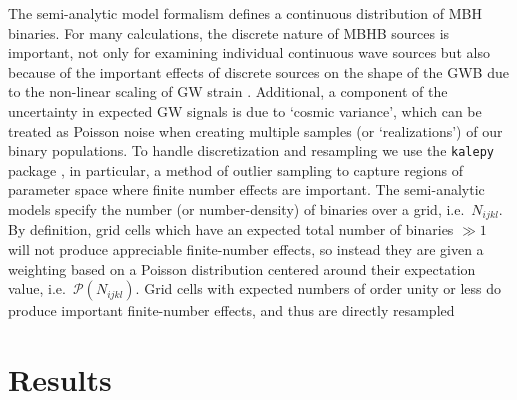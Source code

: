         The semi-analytic model formalism defines a continuous distribution of MBH binaries.  For many calculations, the discrete nature of MBHB sources is important, not only for examining individual continuous wave sources but also because of the important effects of discrete sources on the shape of the GWB due to the non-linear scaling of GW strain \citep{Sesana+2008}.  Additional, a component of the uncertainty in expected GW signals is due to `cosmic variance', which can be treated as Poisson noise when creating multiple samples (or `realizations') of our binary populations.  To handle discretization and resampling we use the \texttt{kalepy} package \citep{kalepy2021}, in particular, a method of outlier sampling to capture regions of parameter space where finite number effects are important.  The \holodeck{} semi-analytic models specify the number (or number-density) of binaries over a grid, i.e.~$N_{ijkl}$.  By definition, grid cells which have an expected total number of binaries $\gg 1$ will not produce appreciable finite-number effects, so instead they are given a weighting based on a Poisson distribution centered around their expectation value, i.e.~$\mathcal{P}(N_{ijkl})$.  Grid cells with expected numbers of order unity or less do produce important finite-number effects, and thus are directly resampled



\section{Results}
    \label{sec:res}




